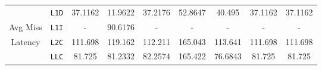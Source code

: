 \documentclass[11pt, swedish, openany]{book}
\begin{document}
\begin{table}[H]
\begin{tabular}{||c|c||c||c|c||c|c||c|c||}
        \hline
                                            & \texttt{L1D} & 37.1162                   & 11.9622  & 37.2176     & 52.8647  & 40.495   & 37.1162  & 37.1162  \\
        Avg Miss                            & \texttt{L1I} & -                         & 90.6176  & -           & -        & -        & -        & -        \\
        Latency                             & \texttt{L2C} & 111.698                   & 119.162  & 112.211     & 165.043  & 113.641  & 111.698  & 111.698  \\
                                            & \texttt{LLC} & 81.725                    & 81.2332  & 82.2574     & 165.422  & 76.6843  & 81.725   & 81.725   \\
        \hline
    \end{tabular}
\end{table}
\end{document}
